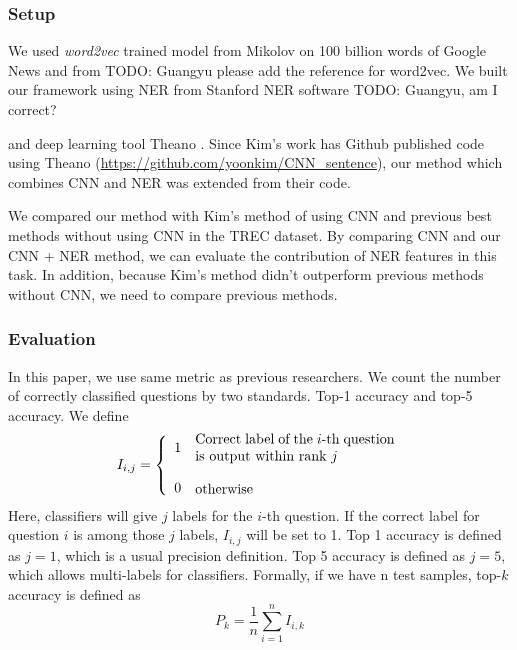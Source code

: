\documentclass[10pt,twocolumn,letterpaper]{article}
\begin{document}
\subsubsection{Setup}
We used \textit{word2vec} trained model from Mikolov \cite{mikolov2013efficient} on 100 billion words of Google News and from TODO: Guangyu please add the reference for word2vec. We built our framework using NER from Stanford NER software \cite{finkel2005incorporating} TODO: Guangyu, am I correct? 

and deep learning tool Theano \cite{Bastien-Theano-2012}. Since Kim's work\cite{kim2014convolutional} has Github published code using Theano (\url{https://github.com/yoonkim/CNN_sentence}), our method which combines CNN and NER was extended from their code. 

We compared our method with Kim's method of using CNN and previous best methods without using CNN in the TREC dataset. By comparing CNN and our CNN + NER method, we can evaluate the contribution of NER features in this task. In addition, because Kim's method didn't outperform previous methods without CNN, we need to compare previous methods.

\subsubsection{Evaluation}
In this paper, we use same metric as previous researchers. We count the number of correctly classified questions by two standards. Top-1 accuracy and top-5 accuracy. We define
$$ 
I_{i,j} = 
\left\{ 
  \begin{array}{ll}
    1 & \parbox{5cm}{Correct label of the $i$-th question is output within rank $j$ }\\
    \\
    0 & \parbox{3cm}{otherwise}
  \end{array} 
\right. 
$$
Here, classifiers will give $j$ labels for the $i$-th question. If the correct label for question $i$ is among those $j$ labels, $I_{i,j}$ will be set to 1. Top 1 accuracy is defined as $j = 1$, which is a usual precision definition. Top 5 accuracy is defined as $j = 5$, which allows multi-labels for classifiers. Formally, if we have n test samples, top-$k $ accuracy is defined as
$$
P_k = \frac{1}{n}\sum_{i=1}^{n} I_{i,k} 
$$
\end{document}
